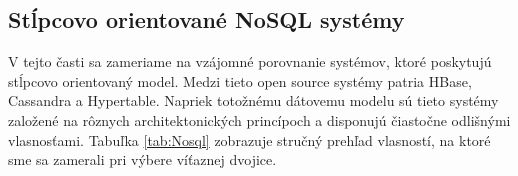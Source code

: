 \documentclass[11pt,twoside,a4paper]{book}
\begin{document}
\subsection*{Stĺpcovo orientované NoSQL systémy}
V tejto časti sa zameriame na vzájomné porovnanie systémov, ktoré poskytujú stĺpcovo orientovaný model. Medzi tieto open source systémy patria HBase, Cassandra a Hypertable. Napriek totožnému dátovemu modelu sú tieto systémy založené na rôznych architektonických princípoch a disponujú čiastočne odlišnými vlasnosťami. Tabuľka \ref{tab:Nosql} zobrazuje stručný prehľad vlasností, na ktoré sme sa zamerali pri výbere víťaznej dvojice.


% 
\end{document}
